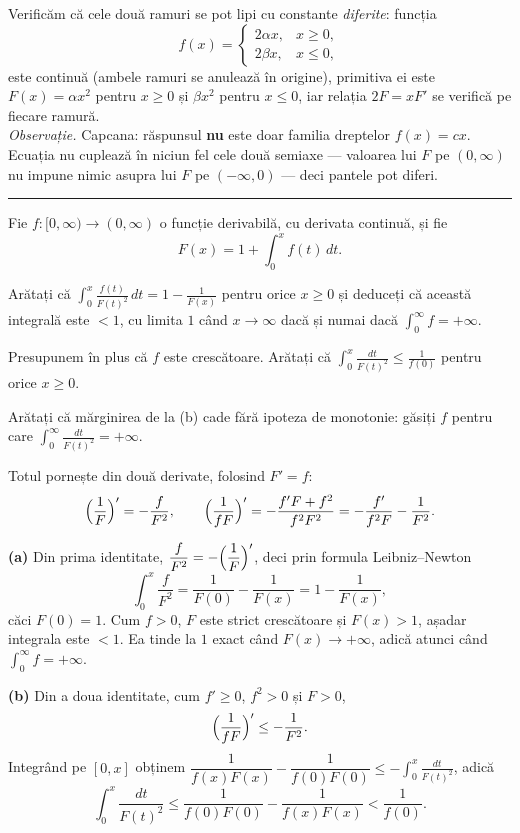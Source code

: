 Verificăm că cele două ramuri se pot lipi cu constante \emph{diferite}: funcția
\[ f(x)=\begin{cases} 2\alpha x, & x\ge 0,\\ 2\beta x, & x\le 0,\end{cases} \]
este continuă (ambele ramuri se anulează în origine), primitiva ei este
$F(x)=\alpha x^2$ pentru $x\ge0$ și $\beta x^2$ pentru $x\le0$, iar relația
$2F=xF'$ se verifică pe fiecare ramură.\\[2pt]
\emph{Observație.} Capcana: răspunsul \textbf{nu} este doar familia dreptelor
$f(x)=cx$. Ecuația nu cuplează în niciun fel cele două semiaxe --- valoarea lui
$F$ pe $(0,\infty)$ nu impune nimic asupra lui $F$ pe $(-\infty,0)$ --- deci
pantele pot diferi.
\vspace{1mm}\hrule

Fie $f:[0,\infty)\to(0,\infty)$ o funcție derivabilă, cu derivata continuă, și fie
\[ F(x)=1+\int_0^{x}f(t)\,dt . \]
\begin{parti}
  \item Arătați că $\displaystyle\int_0^{x}\frac{f(t)}{F(t)^2}\,dt=1-\frac{1}{F(x)}$
        pentru orice $x\ge0$ și deduceți că această integrală este $<1$, cu limita
        $1$ când $x\to\infty$ dacă și numai dacă $\int_0^{\infty}f=+\infty$.
  \item Presupunem în plus că $f$ este crescătoare. Arătați că
        $\displaystyle\int_0^{x}\frac{dt}{F(t)^2}\le\frac{1}{f(0)}$ pentru orice $x\ge0$.
  \item Arătați că mărginirea de la (b) cade fără ipoteza de monotonie: găsiți $f$
        pentru care $\displaystyle\int_0^{\infty}\frac{dt}{F(t)^2}=+\infty$.
\end{parti}
\sol Totul pornește din două derivate, folosind $F'=f$:
\[ \Bigl(\frac{1}{F}\Bigr)'=-\frac{f}{F^2},\qquad
   \Bigl(\frac{1}{fF}\Bigr)'=-\frac{f'F+f^2}{f^2F^2}=-\frac{f'}{f^2F}-\frac{1}{F^2}. \]

\noindent\textbf{(a)} Din prima identitate, $\dfrac{f}{F^2}=-\Bigl(\dfrac1F\Bigr)'$,
deci prin formula Leibniz--Newton
\[ \int_0^{x}\frac{f}{F^2}=\frac{1}{F(0)}-\frac{1}{F(x)}=1-\frac{1}{F(x)}, \]
căci $F(0)=1$. Cum $f>0$, $F$ este strict crescătoare și $F(x)>1$, așadar integrala
este $<1$. Ea tinde la $1$ exact când $F(x)\to+\infty$, adică atunci când
$\int_0^{\infty}f=+\infty$.

\noindent\textbf{(b)} Din a doua identitate, cum $f'\ge0$, $f^2>0$ și $F>0$,
\[ \Bigl(\frac{1}{fF}\Bigr)'\le-\frac{1}{F^2}. \]
Integrând pe $[0,x]$ obținem
$\dfrac{1}{f(x)F(x)}-\dfrac{1}{f(0)F(0)}\le-\displaystyle\int_0^{x}\frac{dt}{F(t)^2}$,
adică
\[ \int_0^{x}\frac{dt}{F(t)^2}\le\frac{1}{f(0)F(0)}-\frac{1}{f(x)F(x)}<\frac{1}{f(0)} . \]

